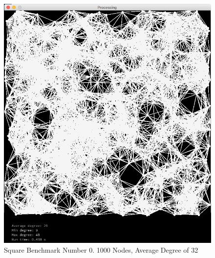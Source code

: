 \documentclass{article}
\begin{document}
\begin{center}
    \begin{figure}
        \includegraphics[scale=0.45]{./images/square_0.png}
        \caption{Square Benchmark Number 0. 1000 Nodes, Average Degree of 32}
        \label{square0}
    \end{figure}
\end{center}
\end{document}
